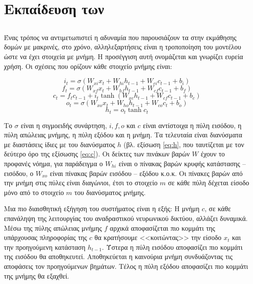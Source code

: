 \section{Εκπαίδευση των }
\subsection{\cite{Hochreiter1997}}

Ένας τρόπος να αντιμετωπιστεί η αδυναμία που παρουσιάζουν τα  στην εκμάθησης δομών με μακρινές, στο χρόνο, αλληλεξαρτήσεις είναι η τροποποίηση του μοντέλου ώστε να έχει στοιχεία με μνήμη.
Η προσέγγιση αυτή ονομάζεται  και γνωρίζει ευρεία χρήση. Οι σχέσεις που ορίζουν κάθε στοιχείο μνήμης είναι:

\begin{equation}
i_t = \sigma{(W_{xi}x_t + W_{hi}h_{t-1} + W_{ci}c_{t-1} + b_i)}
\end{equation}
\begin{equation}
f_t = \sigma{(W_{xf}x_t + W_{hf}h_{t-1} + W_{cf}c_{t-1} + b_f)}
\end{equation}
\begin{equation}
c_t = f_t c_{t-1} + i_t \tanh{(W_{xc} h_{t-1} + W_{cf} c_{t-1} + b_c)}\label{eq:c}
\end{equation}
\begin{equation}
o_t = \sigma(W_{xo}x_t + W_{ho} h_{t-1} + W_{co} c_t + b_o)
\end{equation}
\begin{equation}
h_t = o_t\tanh{c_t}
\end{equation}

Το $\sigma$ είναι η σιγμοειδής συνάρτηση, $i, f, o$ και $c$ είναι αντίστοιχα η πύλη εισόδου, η πύλη απώλειας μνήμης, η πύλη εξόδου και η μνήμη.
Τα τελευταία είναι διανύσματα με διαστάσεις ίδιες με του διανύσματος $h$ (βλ. εξίσωση \ref{eq:h}, που ταυτίζεται με τον δεύτερο όρο της εξίσωσης \ref{eq:c}).
Οι δείκτες των πινάκων βαρών $W$ έχουν το προφανές νόημα, για παράδειγμα ο $W_{hi}$ είναι ο πίνακας βαρών  κρυφής κατάστασης -- εισόδου, ο $W_{xo}$ είναι πίνακας βαρών εισόδου -- εξόδου κ.ο.κ. Οι πίνακες βαρών από την μνήμη στις πύλες είναι διαγώνιοι, έτσι το στοιχείο $m$ σε κάθε πύλη δέχεται είσοδο μόνο από το στοιχείο $m$ του διανύσματος μνήμης.

Μια πιο διαισθητική εξήγηση του συστήματος  είναι η εξής:
Η μνήμη $c$, σε κάθε επανάληψη της λειτουργίας του αναδραστικού νευρωνικού δικτύου, αλλάζει δυναμικά.
Μέσω της πύλης απώλειας μνήμης $f$ αρχικά αποφασίζεται πιο κομμάτι της υπάρχουσας πληροφορίας της $c$ θα κρατήσουμε <<κοιτώντας>> την είσοδο $x_t$ και την προηγούμενη κατάσταση $h_{t-1}$. Ύστερα η πύλη εισόδου αποφασίζει πιο κομμάτι της εισόδου θα αποθηκευτεί.
Αποθηκεύεται η καινούρια μνήμη συνδυάζοντας τις αποφάσεις τον προηγούμενων βημάτων. Τέλος η πύλη εξόδου αποφασίζει πιο κομμάτι της μνήμης θα εξαχθεί.

